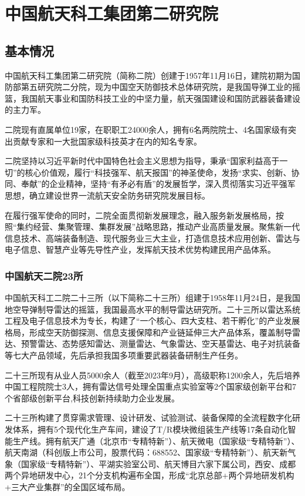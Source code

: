 \documentclass[12pt, a4paper, oneside]{ctexart}
\begin{document}
\section{中国航天科工集团第二研究院}

\subsection{基本情况}

中国航天科工集团第二研究院（简称二院）创建于1957年11月16日，建院初期为国防部第五研究院二分院，现为中国空天防御技术总体研究院，是我国导弹工业的摇篮，我国航天事业和国防科技工业的中坚力量，航天强国建设和国防武器装备建设的主力军。

二院现有直属单位19家，在职职工24000余人，拥有6名两院院士、4名国家级有突出贡献专家和一大批国家级科技英才在内的知名专家。

二院坚持以习近平新时代中国特色社会主义思想为指导，秉承“国家利益高于一切”的核心价值观，履行“科技强军、航天报国”的神圣使命，发扬“求实、创新、协同、奉献”的企业精神，坚持“有矛必有盾”的发展哲学，深入贯彻落实习近平强军思想，确立建设世界一流航天安全防务研究院发展目标。

在履行强军使命的同时，二院全面贯彻新发展理念，融入服务新发展格局，按照“集约经营、集聚管理、集群发展”战略思路，推动产业高质量发展。聚焦新一代信息技术、高端装备制造、现代服务业三大主业，打造信息技术应用创新、雷达与电子信息、智慧产业等先导性产业，发挥航天技术优势构建民用产品体系。

\subsubsection{中国航天二院23所}
中国航天科工二院二十三所（以下简称二十三所）组建于1958年11月24日，是我国地空导弹制导雷达的摇篮，我国最高水平的制导雷达研究所。二十三所以雷达系统工程及电子信息技术为专长，构建了“一个核心、四大支柱、若干孵化”的产业发展格局，形成空天防御探测、信息支援保障和产业链延伸三大产品体系，覆盖制导雷达、预警雷达、态势感知雷达、测量雷达、气象雷达、空天基雷达、电子对抗装备等七大产品领域，先后承担我国多项重要武器装备研制生产任务。

二十三所现有从业人员5000余人（截至2023年9月），高级职称1200余人，先后培养中国工程院院士3人，拥有雷达信号处理全国重点实验室等2个国家级创新平台和7个省部级创新平台,科技创新持续助力企业发展。

二十三所构建了贯穿需求管理、设计研发、试验测试、装备保障的全流程数字化研发体系，拥有5个现代化生产车间，建设了T/R模块微组装生产线等17条自动化智能生产线。拥有航天广通（北京市“专精特新”）、航天微电（国家级“专精特新”）、航天南湖（科创版上市公司，股票代码：688552、国家级“专精特新”）、航天新气象（国家级“专精特新”）、平湖实验室公司、航天博目六家下属公司，西安、成都两个异地研发中心，21个分支机构遍布全国，形成“北京总部+两个异地研发机构+三大产业集群”的全国区域布局。
\end{document}
